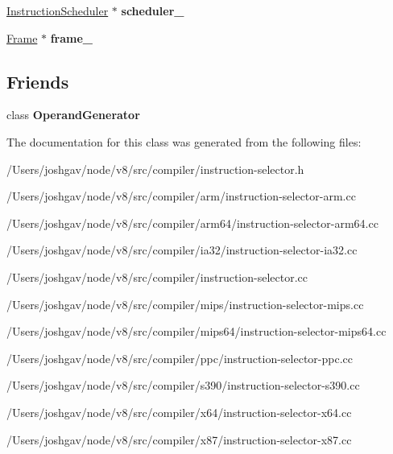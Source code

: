 \begin{DoxyCompactItemize}
\item 
\hyperlink{classv8_1_1internal_1_1compiler_1_1_instruction_scheduler}{Instruction\+Scheduler} $\ast$ {\bfseries scheduler\+\_\+}\hypertarget{classv8_1_1internal_1_1compiler_1_1_instruction_selector_a7097a7cb62c915960f87ed277e57709e}{}\label{classv8_1_1internal_1_1compiler_1_1_instruction_selector_a7097a7cb62c915960f87ed277e57709e}

\item 
\hyperlink{classv8_1_1internal_1_1compiler_1_1_frame}{Frame} $\ast$ {\bfseries frame\+\_\+}\hypertarget{classv8_1_1internal_1_1compiler_1_1_instruction_selector_a809e573ec812239e95ea35fc77b0401c}{}\label{classv8_1_1internal_1_1compiler_1_1_instruction_selector_a809e573ec812239e95ea35fc77b0401c}

\end{DoxyCompactItemize}
\subsection*{Friends}
\begin{DoxyCompactItemize}
\item 
class {\bfseries Operand\+Generator}\hypertarget{classv8_1_1internal_1_1compiler_1_1_instruction_selector_a348308372de1bb413360ad7eff055f94}{}\label{classv8_1_1internal_1_1compiler_1_1_instruction_selector_a348308372de1bb413360ad7eff055f94}

\end{DoxyCompactItemize}


The documentation for this class was generated from the following files\+:\begin{DoxyCompactItemize}
\item 
/\+Users/joshgav/node/v8/src/compiler/instruction-\/selector.\+h\item 
/\+Users/joshgav/node/v8/src/compiler/arm/instruction-\/selector-\/arm.\+cc\item 
/\+Users/joshgav/node/v8/src/compiler/arm64/instruction-\/selector-\/arm64.\+cc\item 
/\+Users/joshgav/node/v8/src/compiler/ia32/instruction-\/selector-\/ia32.\+cc\item 
/\+Users/joshgav/node/v8/src/compiler/instruction-\/selector.\+cc\item 
/\+Users/joshgav/node/v8/src/compiler/mips/instruction-\/selector-\/mips.\+cc\item 
/\+Users/joshgav/node/v8/src/compiler/mips64/instruction-\/selector-\/mips64.\+cc\item 
/\+Users/joshgav/node/v8/src/compiler/ppc/instruction-\/selector-\/ppc.\+cc\item 
/\+Users/joshgav/node/v8/src/compiler/s390/instruction-\/selector-\/s390.\+cc\item 
/\+Users/joshgav/node/v8/src/compiler/x64/instruction-\/selector-\/x64.\+cc\item 
/\+Users/joshgav/node/v8/src/compiler/x87/instruction-\/selector-\/x87.\+cc\end{DoxyCompactItemize}
